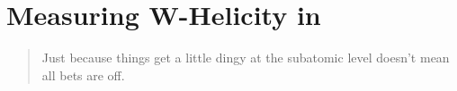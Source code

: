 \chapter{Measuring W-Helicity in \ttbar}
\label{sec:whelicity}
\begin{quote}
Just because things get a little dingy at the subatomic level doesn't mean all bets are off.\\
\end{quote}







